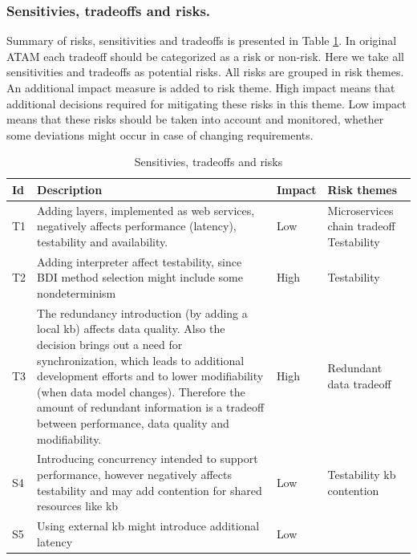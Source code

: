 \documentclass{llncs}
\begin{document}
\subsubsection{Sensitivies, tradeoffs and risks.}
Summary of risks, sensitivities and tradeoffs is presented in Table \ref{tbl:risks}. In original \gls{ATAM} each tradeoff should be categorized as a risk or non-risk. Here we take all sensitivities and tradeoffs as potential risks. All risks are grouped in risk themes. An additional impact measure is added to risk theme. High impact means that additional decisions required for mitigating these risks in this theme. %
Low impact means that these risks should be taken into account and monitored, whether some deviations might occur in case of changing requirements.
\begin{table}	
	\setlength{\tabcolsep}{0.5em}
	\caption{Sensitivies, tradeoffs  and risks }
	\label{tbl:risks}
	\begin{center}
		\begin{tabular}{  l | p{23em} | l | p{6em} }
			\hline			
			Id &
			Description &
			Impact &
			Risk themes
			 \\		
			\hline
			T1 & 
			Adding layers, implemented as web services, negatively affects performance (latency), testability and availability. 
			& 
			Low
			&	
		Microservices chain tradeoff \newline Testability
			\\ \hline
			T2 & 
			Adding interpreter affect testability, since \gls{BDI} method selection might include some nondeterminism  & High &
			Testability
			\\ \hline
			T3 &
			The redundancy introduction (by adding a local \gls{kb}) affects data quality. Also the decision brings out a need for synchronization, which leads to additional development efforts and to lower modifiability (when data model changes). Therefore the amount of redundant information is a tradeoff between performance, data quality and modifiability.  & High &
			Redundant data tradeoff
			\\ \hline
			S4 &
			Introducing concurrency intended to support performance, however negatively affects testability and may add contention for shared resources like \gls{kb} &
			Low &
			Testability \newline \gls{kb} contention
			\\ \hline
			S5 &
			Using external \gls{kb} might introduce additional latency  & Low &

\end{tabular}
\end{center}
\end{table}
\end{document}
